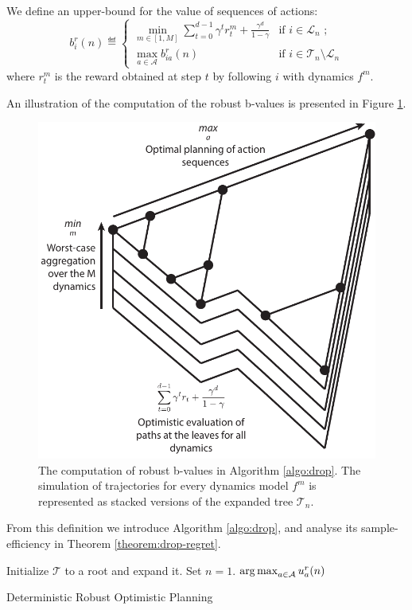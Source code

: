 \documentclass{article}
\begin{document}
\begin{definition} We define an upper-bound for the value of sequences of actions:
\begin{equation}
\label{eq:robust_sequence_ucb}
b_i^r(n)  \eqdef
\begin{cases}
\min_{m\in[1, M]} \sum_{t=0}^{d-1} \gamma^t r_t^m  + \frac{\gamma^d}{1-\gamma} &\text{if } i \in \mathcal{L}_n \text{ ;}\\
\max_{a\in\mathcal{A}} b_{ia}^r(n) & \text{if } i \in \mathcal{T}_n \setminus \mathcal{L}_n 
\end{cases}
\end{equation}
where $r_t^m$ is the reward obtained at step $t$ by following $i$ with dynamics $f^m$.
\end{definition}
An illustration of the computation of the robust b-values is presented in Figure \ref{fig:drop}.


\begin{figure}
\centering
\includegraphics[width=0.5\linewidth]{img/robust-control-tree}
\caption{The computation of robust b-values in Algorithm \ref{algo:drop}. The simulation of trajectories for every dynamics model $f^m$ is represented as stacked versions of the expanded tree $\mathcal{T}_n$.}
\label{fig:drop}
\end{figure}

From this definition we introduce Algorithm \ref{algo:drop}, and analyse its sample-efficiency in Theorem \ref{theorem:drop-regret}.

\begin{algorithm}[tp]
\DontPrintSemicolon
Initialize $\mathcal{T}$ to a root and expand it. Set $n=1$.\;
\Return $\operatorname*{arg\,max}_{a\in \mathcal{A}} u^r_a(n)$
\caption{Deterministic Robust Optimistic Planning}
\label{algo:drop}
\end{algorithm}
\end{document}
